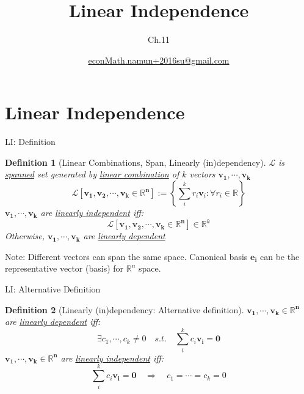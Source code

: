 \documentclass[final]{beamer}
\author[조남운]{\url{econMath.namun+2016su@gmail.com}}
\title{Linear Independence}
\subtitle{Ch.11}
\newtheorem{defn}{Definition}
\begin{document}
	
\maketitle


\section{Linear Independence} %
\label{sec:linear_independence}
\begin{frame}[t]{LI: Definition}
	\begin{defn}
		[Linear Combinations, Span, Linearly (in)dependency]
		$\mathcal{L}$ is \uline{spanned} set generated by \uline{linear combination} of $k$ vectors $\mathbf{v_1,\cdots,v_k}$
		\[
			\mathcal{L}[\mathbf{v_1,v_2,\cdots,v_k\in\mathbb{R}^n}]:=\left\{\sum_i^k r_i \mathbf{v}_i: \forall r_i\in \mathbb{R} \right\}
		\]
		$\mathbf{v_1,\cdots,v_k}$ are \uline{linearly independent} iff:
		\[
			\mathcal{L}[\mathbf{v_1,v_2,\cdots,v_k\in\mathbb{R}^n}]\in \mathbb{R}^k
		\]
		Otherwise, $\mathbf{v_1,\cdots,v_k}$ are \uline{linearly dependent}
	\end{defn}
	Note: Different vectors can span the same space. Canonical basis $\mathbf{e_i}$ can be the representative vector (basis) for $\mathbb{R}^n$ space.
\end{frame}

\begin{frame}[t]{LI: Alternative Definition}
	\begin{defn}
		[Linearly (in)dependency: Alternative definition]
		$\mathbf{v_1,\cdots,v_k\in\mathbb{R}^n}$ are \uline{linearly dependent} iff:
		\[
			\exists c_1,\cdots,c_k \neq 0 \quad s.t.\quad \sum_i^k c_i\mathbf{v_i} = \mathbf{0}
		\]
		$\mathbf{v_1,\cdots,v_k\in\mathbb{R}^n}$ are \uline{linearly independent} iff:
		\[
			\sum_i^k c_i\mathbf{v_i} = \mathbf{0} \quad\Rightarrow\quad c_1 = \cdots = c_k = 0
		\]
	\end{defn}
\end{frame}
\end{document}
